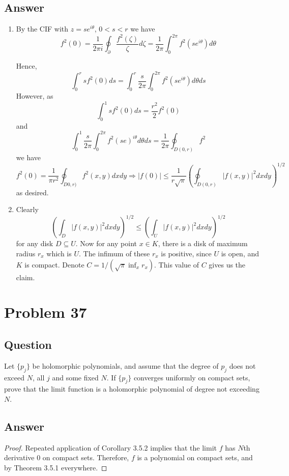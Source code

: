 \documentclass[11pt]{article}
\begin{document}
\subsection{Answer}
\begin{enumerate}
\item By the CIF with $z = s e^{i \theta}$, $0< s  < r$ we have
\[f^2(0) = \frac{1}{2 \pi i } \oint_\partial \frac{f^2(\zeta)}{\zeta} d \zeta  =\frac{1}{2 \pi} \int_0^{2 \pi} f^2 ( s e^{i \theta}) d \theta\]

Hence,
\[\int_0^r sf^2(0) ds = \int_0^r \frac{s}{2 \pi} \int_0^{2\pi} f^2 (se^{i \theta}) d\theta ds\]
However, as
\[\int_0^1 s f^2(0) ds = \frac{r^2}{2} f^2(0)\]
and
\[\int_0^1 \frac{s}{2 \pi} \int_0^{2\pi} f^2(se)^{i \theta} d\theta ds = \frac{1}{2 \pi} \oint_{D(0,r)} f^2 \]
we have
\[f^2(0) = \frac{1}{\pi r^2 } \oint_{D0,r)} f^2 (x,y) dx dy \Rightarrow |f(0)| \leq \frac{1}{r \sqrt \pi} \left( \oint_{D(0,r)} |f(x,y)|^2 dxdy \right) ^{1/2}\]
as desired.
\item Clearly 
\[  \left( \int_{D} |f(x,y)|^2 dxdy\right)^{1/2}  \leq  \left( \int_U |f(x,y)|^2 dxdy\right)^{1/2} \]
for any disk $D \subseteq U$. Now for any point $x \in K$, there is a disk of maximum radius  $r_x$ which is $U$. The infimum of these $r_x$ is positive, since $U$ is open, and $K$ is compact. Denote $C = 1/(\sqrt \pi \inf_x r_x)$. This value of $C$  gives us the claim.
\end{enumerate}

\section{Problem 37}
\subsection{Question}
Let $\{p_j\}$ be holomorphic polynomials, and assume that the degree of $p_j$ does not exceed $N$, all $j$ and some fixed $N$. If $\{p_j\}$ converges uniformly on compact sets, prove that the limit function is a holomorphic polynomial of degree not exceeding $N$.
\subsection{Answer}
\begin{proof}
Repeated application of Corollary 3.5.2 implies that the limit $f$ has $N$th derivative 0 on compact sets. Therefore, $f$ is a polynomial on compact sets, and by Theorem 3.5.1 everywhere.
\end{proof}
\end{document}
